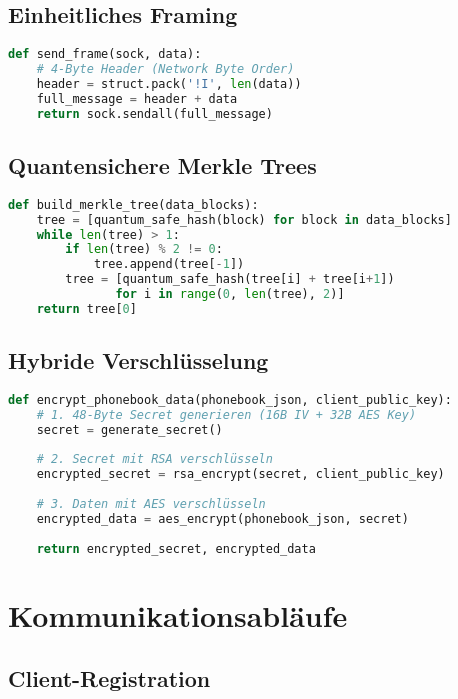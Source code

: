 \documentclass[10pt,a4paper]{article}
\begin{document}
\subsection{Einheitliches Framing}

\begin{lstlisting}[language=Python,caption=Frame-Format]
def send_frame(sock, data):
    # 4-Byte Header (Network Byte Order)
    header = struct.pack('!I', len(data))
    full_message = header + data
    return sock.sendall(full_message)
\end{lstlisting}

\subsection{Quantensichere Merkle Trees}

\begin{lstlisting}[language=Python,caption=Merkle-Tree-Berechnung]
def build_merkle_tree(data_blocks):
    tree = [quantum_safe_hash(block) for block in data_blocks]
    while len(tree) > 1:
        if len(tree) % 2 != 0:
            tree.append(tree[-1])
        tree = [quantum_safe_hash(tree[i] + tree[i+1]) 
               for i in range(0, len(tree), 2)]
    return tree[0]
\end{lstlisting}

\subsection{Hybride Verschlüsselung}

\begin{lstlisting}[language=Python,caption=Verschlüsselungsprozess]
def encrypt_phonebook_data(phonebook_json, client_public_key):
    # 1. 48-Byte Secret generieren (16B IV + 32B AES Key)
    secret = generate_secret()
    
    # 2. Secret mit RSA verschlüsseln
    encrypted_secret = rsa_encrypt(secret, client_public_key)
    
    # 3. Daten mit AES verschlüsseln
    encrypted_data = aes_encrypt(phonebook_json, secret)
    
    return encrypted_secret, encrypted_data
\end{lstlisting}

\section{Kommunikationsabläufe}

\subsection{Client-Registration}
\end{document}
